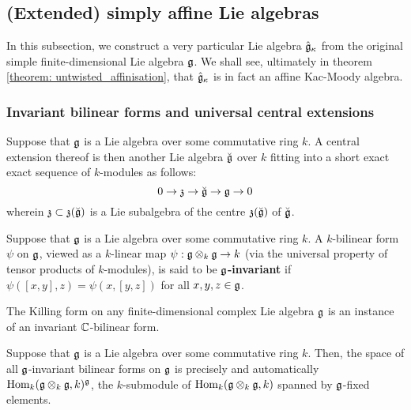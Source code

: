     \subsection{(Extended) simply affine Lie algebras}
        In this subsection, we construct a very particular Lie algebra $\hat{\mathfrak{g}}_{\kappa}$ from the original simple finite-dimensional Lie algebra $\mathfrak{g}$. We shall see, ultimately in theorem \ref{theorem: untwisted_affinisation}, that $\hat{\mathfrak{g}}_{\kappa}$ is in fact an affine Kac-Moody algebra. 
    
        \subsubsection{Invariant bilinear forms and universal central extensions}
            \begin{definition} \label{def: central_extensions_of_lie_algebras}
                Suppose that $\mathfrak{g}$ is a Lie algebra over some commutative ring $k$. A central extension thereof is then another Lie algebra $\breve{\mathfrak{g}}$ over $k$ fitting into a short exact exact sequence of $k$-modules as follows:
                    $$0 \to \mathfrak{z} \to \breve{\mathfrak{g}} \to \mathfrak{g} \to 0$$
                wherein $\mathfrak{z} \subset \mathfrak{z}(\breve{\mathfrak{g}})$ is a Lie subalgebra of the centre $\mathfrak{z}(\breve{\mathfrak{g}})$ of $\breve{\mathfrak{g}}$.
            \end{definition}
            \begin{definition} \label{def: invariant_bilinear_forms}
                Suppose that $\mathfrak{g}$ is a Lie algebra over some commutative ring $k$. A $k$-bilinear form $\psi$ on $\mathfrak{g}$, viewed as a $k$-linear map $\psi: \g \tensor_k \g \to k$ (via the universal property of tensor products of $k$-modules), is said to be \textbf{$\mathfrak{g}$-invariant} if $\psi([x, y], z) = \psi(x, [y, z])$ for all $x, y, z \in \mathfrak{g}$.
            \end{definition}
            \begin{example}
                The Killing form on any finite-dimensional complex Lie algebra $\mathfrak{g}$ is an instance of an invariant $\mathbb{C}$-bilinear form.
            \end{example}
            \begin{remark} \label{remark: spaces_oe^-_invariant_bilinear_forms}
                Suppose that $\mathfrak{g}$ is a Lie algebra over some commutative ring $k$. Then, the space of all $\mathfrak{g}$-invariant bilinear forms on $\mathfrak{g}$ is precisely and automatically $\Hom_k(\g \tensor_k \g, k)^{\g}$, the $k$-submodule of $\Hom_k(\g \tensor_k \g, k)$ spanned by $\mathfrak{g}$-fixed elements. 
            \end{remark}
